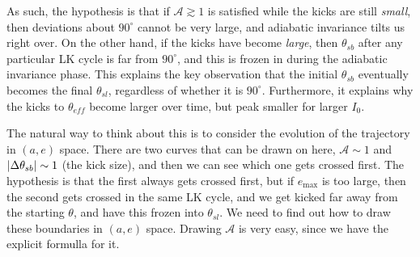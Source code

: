 \documentclass[11pt,
        usenames, %
        dvipsnames %
    ]{article}
\DeclarePairedDelimiter\abs{\lvert}{\rvert}
\begin{document}
As such, the hypothesis is that if $\mathcal{A} \gtrsim 1$ is satisfied while
the kicks are still \emph{small}, then deviations about $90^\circ$ cannot be
very large, and adiabatic invariance tilts us right over. On the other hand, if
the kicks have become \emph{large}, then $\theta_{sb}$ after any particular LK
cycle is far from $90^\circ$, and this is frozen in during the adiabatic
invariance phase. This explains the key observation that the initial
$\theta_{sb}$ eventually becomes the final $\theta_{sl}$, regardless of whether
it is $90^\circ$. Furthermore, it explains why the kicks to $\theta_{eff}$
become larger over time, but peak smaller for larger $I_0$.

The natural way to think about this is to consider the evolution of the
trajectory in $(a, e)$ space. There are two curves that can be drawn on here,
$\mathcal{A} \sim 1$ and $\abs*{\Delta \theta_{sb}} \sim 1$ (the kick size), and
then we can see which one gets crossed first. The hypothesis is that the first
always gets crossed first, but if $e_{\max}$ is too large, then the second gets
crossed in the same LK cycle, and we get kicked far away from the starting
$\theta$, and have this frozen into $\theta_{sl}$. We need to find out how to
draw these boundaries in $(a, e)$ space. Drawing $\mathcal{A}$ is very easy,
since we have the explicit formulla for it.
\end{document}

